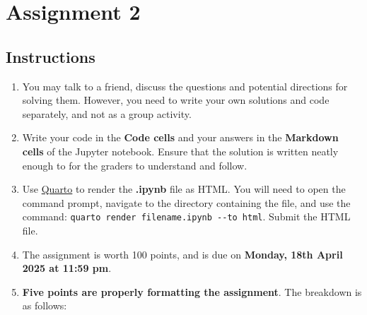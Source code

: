\documentclass[
  letterpaper,
  DIV=11,
  numbers=noendperiod]{scrreprt}
\begin{document}
\chapter{Assignment 2}\label{assignment-2}

\section*{Instructions}\label{instructions-1}


\begin{enumerate}
\def\labelenumi{\arabic{enumi}.}
\item
  You may talk to a friend, discuss the questions and potential
  directions for solving them. However, you need to write your own
  solutions and code separately, and not as a group activity.
\item
  Write your code in the \textbf{Code cells} and your answers in the
  \textbf{Markdown cells} of the Jupyter notebook. Ensure that the
  solution is written neatly enough to for the graders to understand and
  follow.
\item
  Use
  \href{https://quarto.org/docs/output-formats/html-basics.html}{Quarto}
  to render the \textbf{.ipynb} file as HTML. You will need to open the
  command prompt, navigate to the directory containing the file, and use
  the command: \texttt{quarto\ render\ filename.ipynb\ -\/-to\ html}.
  Submit the HTML file.
\item
  The assignment is worth 100 points, and is due on \textbf{Monday, 18th
  April 2025 at 11:59 pm}.
\item
  \textbf{Five points are properly formatting the assignment}. The
  breakdown is as follows:


\end{enumerate}
\end{document}
